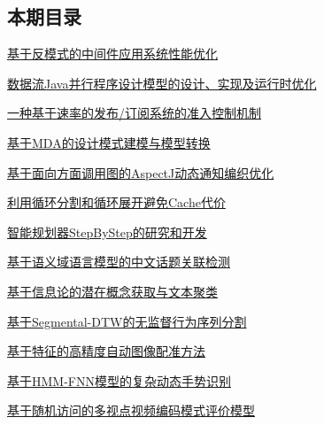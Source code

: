\documentclass[a4paper]{article}
\begin{document}
\subsection{本期目录}
\href{http://www.jos.org.cn/ch/reader/download_pdf.aspx?file_no=20080901&year_id=2008&quarter_id=9&falg=1}{基于反模式的中间件应用系统性能优化}

\href{http://www.jos.org.cn/ch/reader/download_pdf.aspx?file_no=20080902&year_id=2008&quarter_id=9&falg=1}{数据流Java并行程序设计模型的设计、实现及运行时优化}

\href{http://www.jos.org.cn/ch/reader/download_pdf.aspx?file_no=20080903&year_id=2008&quarter_id=9&falg=1}{一种基于速率的发布/订阅系统的准入控制机制}

\href{http://www.jos.org.cn/ch/reader/download_pdf.aspx?file_no=20080904&year_id=2008&quarter_id=9&falg=1}{基于MDA的设计模式建模与模型转换}

\href{http://www.jos.org.cn/ch/reader/download_pdf.aspx?file_no=20080905&year_id=2008&quarter_id=9&falg=1}{基于面向方面调用图的AspectJ动态通知编织优化}

\href{http://www.jos.org.cn/ch/reader/download_pdf.aspx?file_no=20080906&year_id=2008&quarter_id=9&falg=1}{利用循环分割和循环展开避免Cache代价}

\href{http://www.jos.org.cn/ch/reader/download_pdf.aspx?file_no=20080907&year_id=2008&quarter_id=9&falg=1}{智能规划器StepByStep的研究和开发}

\href{http://www.jos.org.cn/ch/reader/download_pdf.aspx?file_no=20080908&year_id=2008&quarter_id=9&falg=1}{基于语义域语言模型的中文话题关联检测}

\href{http://www.jos.org.cn/ch/reader/download_pdf.aspx?file_no=20080909&year_id=2008&quarter_id=9&falg=1}{基于信息论的潜在概念获取与文本聚类}

\href{http://www.jos.org.cn/ch/reader/download_pdf.aspx?file_no=20080910&year_id=2008&quarter_id=9&falg=1}{基于Segmental-DTW的无监督行为序列分割}

\href{http://www.jos.org.cn/ch/reader/download_pdf.aspx?file_no=20080911&year_id=2008&quarter_id=9&falg=1}{基于特征的高精度自动图像配准方法}

\href{http://www.jos.org.cn/ch/reader/download_pdf.aspx?file_no=20080912&year_id=2008&quarter_id=9&falg=1}{基于HMM-FNN模型的复杂动态手势识别}

\href{http://www.jos.org.cn/ch/reader/download_pdf.aspx?file_no=20080913&year_id=2008&quarter_id=9&falg=1}{基于随机访问的多视点视频编码模式评价模型}
\end{document}
